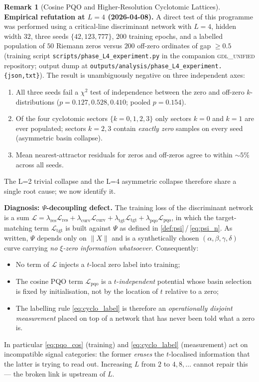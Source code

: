 \documentclass[11pt, a4paper]{article}
\theoremstyle{definition}
\newtheorem{remark}{Remark}[section]
\theoremstyle{plain}
\newcommand{\xif}{\xi}                      %
\newcommand{\Psip}{\Psi}                    %
\begin{document}
\begin{remark}[Cosine PQO and Higher-Resolution Cyclotomic Lattices]
\smallskip\noindent\textbf{Empirical refutation at $L = 4$
(2026-04-08).} A direct test of this programme was performed using a
critical-line discriminant network with $L=4$, hidden width $32$, three
seeds $\{42, 123, 777\}$, $200$ training epochs, and a labelled
population of $50$ Riemann zeros versus $200$ off-zero ordinates of gap
$\geq 0.5$ (training script
\texttt{scripts/phase\_L4\_experiment.py} in the companion
\textsc{gdl\_unified} repository; output dump at
\texttt{outputs/analysis/phase\_L4\_experiment.\{json,txt\}}). The
result is unambiguously negative on three independent axes:
\begin{enumerate}
  \item All three seeds fail a $\chi^2$ test of independence between the
        zero and off-zero $k$-distributions ($p = 0.127, 0.528, 0.410$;
        pooled $p = 0.154$).
  \item Of the four cyclotomic sectors $\{k=0,1,2,3\}$ only sectors
        $k=0$ and $k=1$ are ever populated; sectors $k=2,3$ contain
        \emph{exactly zero} samples on every seed (asymmetric basin
        collapse).
  \item Mean nearest-attractor residuals for zeros and off-zeros agree
        to within $\sim 5\%$ across all seeds.
\end{enumerate}
The L=2 trivial collapse and the L=4 asymmetric collapse therefore
share a single root cause; we now identify it.

\smallskip\noindent\textbf{Diagnosis: $\Psip$-decoupling defect.} The
training loss of the discriminant network is a sum
$\mathcal{L} = \lambda_{\mathrm{res}}\mathcal{L}_{\mathrm{res}} +
        \lambda_{\mathrm{curv}}\mathcal{L}_{\mathrm{curv}} +
        \lambda_{\mathrm{tgt}}\mathcal{L}_{\mathrm{tgt}} +
        \lambda_{\mathrm{pqo}}\mathcal{L}_{\mathrm{pqo}}$,
in which the target-matching term $\mathcal{L}_{\mathrm{tgt}}$ is built
against $\Psip$ as defined in \cref{def:psi}\,/\,\cref{eq:psi_n}. As
written, $\Psip$ depends only on $\|X\|$ and is a synthetically chosen
$(\alpha,\beta,\gamma,\delta)$ curve carrying \emph{no $\xif$-zero
information whatsoever}. Consequently:
\begin{itemize}
  \item No term of $\mathcal{L}$ injects a $t$-local zero label into training;
  \item The cosine PQO term $\mathcal{L}_{\mathrm{pqo}}$ is a
        $t$-\emph{independent} potential whose basin selection is fixed
        by initialisation, not by the location of $t$ relative to a
        zero;
  \item The labelling rule \cref{eq:cyclo_label} is therefore an
        \emph{operationally disjoint measurement} placed on top of a
        network that has never been told what a zero is.
\end{itemize}
In particular \cref{eq:pqo_cos} (training) and \cref{eq:cyclo_label}
(measurement) act on incompatible signal categories: the former
\emph{erases} the $t$-localised information that the latter is trying
to read out. Increasing $L$ from $2$ to $4, 8, \ldots$ cannot repair
this — the broken link is upstream of $L$.


\end{remark}
\end{document}
